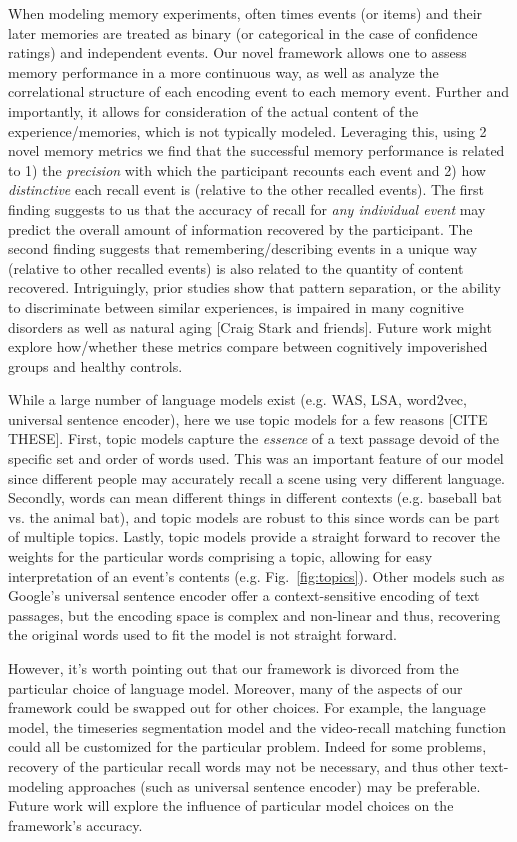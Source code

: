 \documentclass{article}
\begin{document}
When modeling memory experiments, often times events (or items) and their later memories are treated as binary (or categorical in the case of confidence ratings) and independent events. Our novel framework allows one to assess memory performance in a more continuous way, as well as analyze the correlational structure of each encoding event to each memory event. Further and importantly, it allows for consideration of the actual content of the experience/memories, which is not typically modeled. Leveraging this, using 2 novel memory metrics we find that the successful memory performance is related to 1) the \textit{precision} with which the participant recounts each event and 2) how \textit{distinctive} each recall event is (relative to the other recalled events). The first finding suggests to us that the accuracy of recall for \textit{any individual event} may predict the overall amount of information recovered by the participant.  The second finding suggests that remembering/describing events in a unique way (relative to other recalled events) is also related to the quantity of content recovered. Intriguingly, prior studies show that pattern separation, or the ability to discriminate between similar experiences, is impaired in many cognitive disorders as well as natural aging [Craig Stark and friends].  Future work might explore how/whether these metrics compare between cognitively impoverished groups and healthy controls.

While a large number of language models exist (e.g. WAS, LSA, word2vec, universal sentence encoder), here we use topic models for a few reasons [CITE THESE].  First, topic models capture the \textit{essence} of a text passage devoid of the specific set and order of words used.  This was an important feature of our model since different people may accurately recall a scene using very different language. Secondly, words can mean different things in different contexts (e.g. baseball bat vs. the animal bat), and topic models are robust to this since words can be part of multiple topics.  Lastly, topic models provide a straight forward to recover the weights for the particular words comprising a topic, allowing for easy interpretation of an event's contents (e.g. Fig.~\ref{fig:topics}). Other models such as Google's universal sentence encoder offer a context-sensitive encoding of text passages, but the encoding space is complex and non-linear and thus, recovering the original words used to fit the model is not straight forward.  

However, it's worth pointing out that our framework is divorced from the particular choice of language model. Moreover, many of the aspects of our framework could be swapped out for other choices. For example, the language model, the timeseries segmentation model and the video-recall matching function could all be customized for the particular problem. Indeed for some problems, recovery of the particular recall words may not be necessary, and thus other text-modeling approaches (such as universal sentence encoder) may be preferable. Future work will explore the influence of particular model choices on the framework's accuracy.
\end{document}
